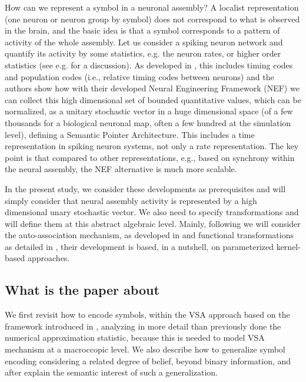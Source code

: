 \documentclass[sn-mathphys]{sn-jnl}
\begin{document}
How can we represent a symbol in a neuronal assembly? A localist representation (one neuron or neuron group by symbol) does not correspond to what is observed in the brain, and the basic idea is that a symbol corresponds to a pattern of activity of the whole assembly. Let us consider a spiking neuron network and quantify its activity by some statistics, e.g. the neuron rates, or higher order statistics (see e.g. \cite{cessac_dynamics_2008} for a discussion). As developed in \cite{eliasmith_neural_2002}, this includes timing codes and population codes (i.e., relative timing codes between neurons) and the authors show how with their developed Neural Engineering Framework (NEF) we can collect this high dimensional set of bounded quantitative values, which can be normalized, as a unitary stochastic vector in a huge dimensional space (of a few thousands for a biological neuronal map, often a few hundred at the simulation level), defining a Semantic Pointer Architecture. This includes a time representation in spiking neuron systems, not only a rate representation. The key point is that compared to other representations, e.g., based on synchrony within the neural assembly, the NEF alternative is much more scalable.

In the present study, we consider these developments as prerequisites and will simply consider that neural assembly activity is represented by a high dimensional unary stochastic vector. We also need to specify transformations and will define them at this abstract algebraic level. Mainly, following \cite{mercier_ontology_2021} we will consider the auto-association mechanism, as developed in \cite{stewart_biologically_2011} and functional transformations as detailed in \cite{eliasmith_neural_2002}, their development is based, in a nutshell, on parameterized kernel-based approaches.

\subsection{What is the paper about}

We first revisit how to encode symbols, within the VSA approach based on the framework introduced in \cite{eliasmith_how_2013}, analyzing in more detail than previously done the numerical approximation statistic, because this is needed to model VSA mechanism at a macroccopic level. We also describe how to generalize symbol encoding considering a related degree of belief, beyond binary information, and after \cite{mercier_ontology_2021} explain the semantic interest of such a generalization.
\end{document}
